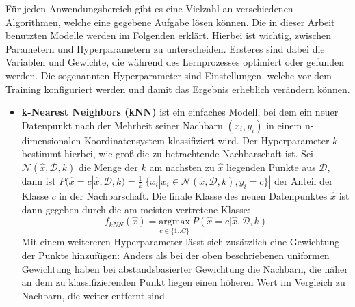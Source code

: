 Für jeden Anwendungsbereich gibt es eine Vielzahl an verschiedenen Algorithmen, welche eine gegebene Aufgabe
 lösen können. Die in dieser Arbeit benutzten Modelle werden im Folgenden erklärt. Hierbei ist wichtig, zwischen
 Parametern und Hyperparametern zu unterscheiden. Ersteres sind dabei die Variablen und Gewichte, die während
 des Lernprozesses optimiert oder gefunden werden. Die sogenannten Hyperparameter sind Einstellungen, welche
 vor dem Training konfiguriert werden und damit das Ergebnis erheblich verändern können.

\begin{itemize}

   \item \textbf{k-Nearest Neighbors (kNN)} ist ein einfaches Modell, bei dem ein neuer Datenpunkt nach der
    Mehrheit seiner Nachbarn $(x_i, y_i)$ in einem n-dimensionalen Koordinatensystem klassifiziert wird. Der
    Hyperparameter $k$ bestimmt hierbei, wie groß die zu betrachtende Nachbarschaft ist. Sei
            $\mathcal{N}(\hat{x}, \mathcal{D}, k)$
    die Menge der $k$ am nächsten zu $\hat{x}$ liegenden Punkte aus $\mathcal{D}$, dann ist
            $P(\hat{x}=c|\hat{x}, \mathcal{D}, k) = \frac{1}{k} |\{x_i | x_i \in \mathcal{N}(\hat{x}, \mathcal{D}, k), y_i=c\}|$
    der Anteil der Klasse $c$ in der Nachbarschaft. Die finale Klasse des neuen Datenpunktes $\hat{x}$ ist dann
    gegeben durch die am meisten vertretene Klasse:
    \begin{equation}
            f_{kNN}(\hat{x}) = \underset{c \in \{1..C\}}{\mathrm{argmax}}\ P(\hat{x}=c|\hat{x}, \mathcal{D}, k)
    \end{equation}
    Mit einem weitereren Hyperparameter lässt sich zusätzlich eine Gewichtung der Punkte hinzufügen: Anders als
    bei der oben beschriebenen uniformen Gewichtung haben bei abstandsbasierter Gewichtung die Nachbarn, die näher
    an dem zu klassifizierenden Punkt liegen einen höheren Wert im Vergleich zu Nachbarn, die weiter entfernt sind.


\end{itemize}
